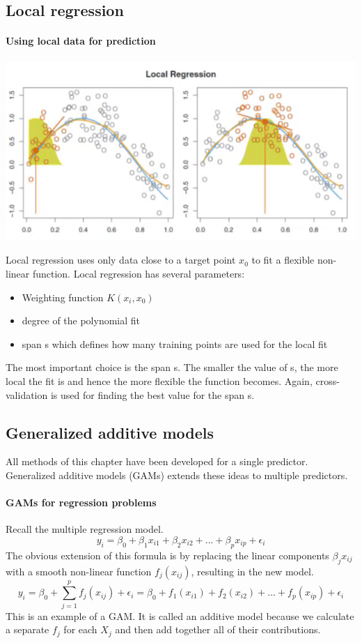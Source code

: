 \documentclass[../document.tex]{subfiles}
\begin{document}
	\subsection{Local regression}

	\paragraph{Using local data for prediction}
	\begin{center}
		\includegraphics[width=.5\textwidth]{pictures/local_regression}
	\end{center}
	Local regression uses only data close to a target point \(x_{0}\) to fit a flexible non-linear function. Local regression has several parameters:
	\begin{itemize}
		\item Weighting function \(K(x_{i},x_{0})\)
		\item degree of the polynomial fit
		\item span s which defines how many training points are used for the local fit
	\end{itemize}
	The most important choice is the span s. The smaller the value of s, the more local the fit is and hence the more flexible the function becomes. Again, cross-validation is used for finding the best value for the span s.

	\sectionbreak
	\subsection{Generalized additive models}
	All methods of this chapter have been developed for a single predictor. Generalized additive models (GAMs) extends these ideas to multiple predictors.

	\paragraph{GAMs for regression problems}
	Recall the multiple regression model.
	\begin{equation}
		y_{i}=\beta_{0}+\beta_{1}x_{i1}+\beta_{2}x_{i2}+...+\beta_{p}x_{ip}+\epsilon_{i}
	\end{equation}
	The obvious extension of this formula is by replacing the linear components \(\beta_{j}x_{ij}\) with a smooth non-linear function \(f_{j}(x_{ij})\), resulting in the new model.
	\begin{equation}
		y_{i}=\beta_{0}+\sum_{j=1}^{p}f_{j}(x_{ij})+\epsilon_{i} = \beta_{0}+f_{1}(x_{i1})+f_{2}(x_{i2})+...+f_{p}(x_{ip})+\epsilon_{i}
	\end{equation}
	This is an example of a GAM. It is called an additive model because we calculate a separate \(f_{j}\) for each \(X_{j}\) and then add together all of their contributions.
\end{document}

